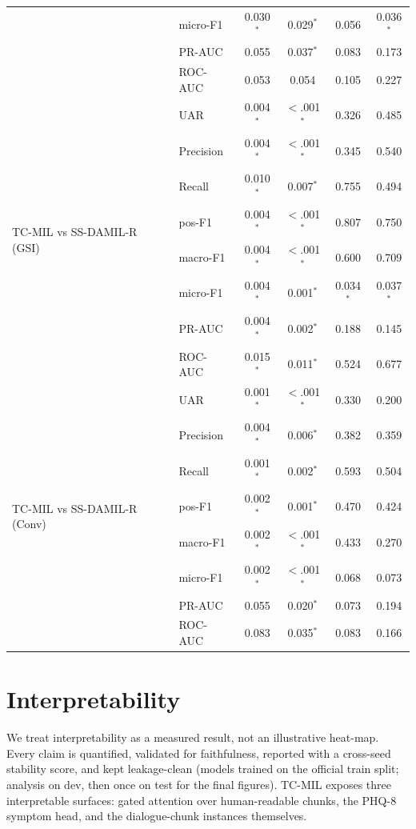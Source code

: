 \documentclass[conference]{IEEEtran}
\begin{document}
\begin{table}[tp]
\begin{tabular}{@{}ll cc cc@{}}
 & micro-F1 & 0.030$^{*}$ & 0.029$^{*}$ & 0.056 & 0.036$^{*}$ \\
 & PR-AUC & 0.055 & 0.037$^{*}$ & 0.083 & 0.173 \\
 & ROC-AUC & 0.053 & 0.054 & 0.105 & 0.227 \\
\midrule
\multirow{8}{*}{TC-MIL vs SS-DAMIL-R (GSI)}
 & UAR & 0.004$^{*}$ & $<$.001$^{*}$ & 0.326 & 0.485 \\
 & Precision & 0.004$^{*}$ & $<$.001$^{*}$ & 0.345 & 0.540 \\
 & Recall & 0.010$^{*}$ & 0.007$^{*}$ & 0.755 & 0.494 \\
 & pos-F1 & 0.004$^{*}$ & $<$.001$^{*}$ & 0.807 & 0.750 \\
 & macro-F1 & 0.004$^{*}$ & $<$.001$^{*}$ & 0.600 & 0.709 \\
 & micro-F1 & 0.004$^{*}$ & 0.001$^{*}$ & 0.034$^{*}$ & 0.037$^{*}$ \\
 & PR-AUC & 0.004$^{*}$ & 0.002$^{*}$ & 0.188 & 0.145 \\
 & ROC-AUC & 0.015$^{*}$ & 0.011$^{*}$ & 0.524 & 0.677 \\
\midrule
\multirow{8}{*}{TC-MIL vs SS-DAMIL-R (Conv)}
 & UAR & 0.001$^{*}$ & $<$.001$^{*}$ & 0.330 & 0.200 \\
 & Precision & 0.004$^{*}$ & 0.006$^{*}$ & 0.382 & 0.359 \\
 & Recall & 0.001$^{*}$ & 0.002$^{*}$ & 0.593 & 0.504 \\
 & pos-F1 & 0.002$^{*}$ & 0.001$^{*}$ & 0.470 & 0.424 \\
 & macro-F1 & 0.002$^{*}$ & $<$.001$^{*}$ & 0.433 & 0.270 \\
 & micro-F1 & 0.002$^{*}$ & $<$.001$^{*}$ & 0.068 & 0.073 \\
 & PR-AUC & 0.055 & 0.020$^{*}$ & 0.073 & 0.194 \\
 & ROC-AUC & 0.083 & 0.035$^{*}$ & 0.083 & 0.166 \\
\bottomrule
\end{tabular}
\end{table}

\section{Interpretability}
\label{sec:interpret}

We treat interpretability as a measured result, not an illustrative heat-map.
Every claim is quantified, validated for faithfulness, reported with a
cross-seed stability score, and kept leakage-clean (models trained on the
official train split; analysis on dev, then once on test for the final
figures). TC-MIL exposes three interpretable surfaces: gated attention over
human-readable chunks, the PHQ-8 symptom head, and the dialogue-chunk
instances themselves.
\end{document}

